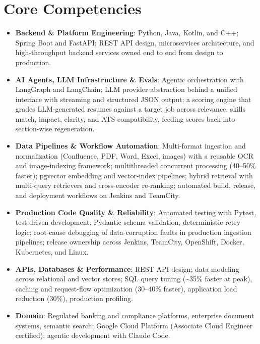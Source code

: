 \documentclass[11pt,a4paper,sans]{moderncv}
\begin{document}
\section{Core Competencies}
\vspace{1pt}
\begin{itemize}

\item \textbf{Backend \& Platform Engineering}: Python, Java, Kotlin, and C++; Spring Boot and FastAPI; REST API design, microservices architecture, and high-throughput backend services owned end to end from design to production.

\item \textbf{AI Agents, LLM Infrastructure \& Evals}: Agentic orchestration with LangGraph and LangChain; LLM provider abstraction behind a unified interface with streaming and structured JSON output; a scoring engine that grades LLM-generated resumes against a target job across relevance, skills match, impact, clarity, and ATS compatibility, feeding scores back into section-wise regeneration.

\item \textbf{Data Pipelines \& Workflow Automation}: Multi-format ingestion and normalization (Confluence, PDF, Word, Excel, images) with a reusable OCR and image-indexing framework; multithreaded concurrent processing (40--50\% faster); pgvector embedding and vector-index pipelines; hybrid retrieval with multi-query retrievers and cross-encoder re-ranking; automated build, release, and deployment workflows on Jenkins and TeamCity.

\item \textbf{Production Code Quality \& Reliability}: Automated testing with Pytest, test-driven development, Pydantic schema validation, deterministic retry logic; root-cause debugging of data-corruption faults in production ingestion pipelines; release ownership across Jenkins, TeamCity, OpenShift, Docker, Kubernetes, and Linux.

\item \textbf{APIs, Databases \& Performance}: REST API design; data modeling across relational and vector stores; SQL query tuning (\textasciitilde35\% faster at peak), caching and request-flow optimization (30--40\% faster), application load reduction (30\%), production profiling.

\item \textbf{Domain}: Regulated banking and compliance platforms, enterprise document systems, semantic search; Google Cloud Platform (Associate Cloud Engineer certified); agentic development with Claude Code.

\end{itemize}
\end{document}
